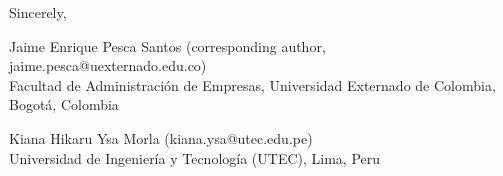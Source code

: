 \documentclass[11pt]{article}
\begin{document}
Sincerely,

\vspace{1.5em}

Jaime Enrique Pesca Santos (corresponding author,
jaime.pesca@uexternado.edu.co)\\
Facultad de Administraci\'on de Empresas, Universidad Externado de
Colombia, Bogot\'a, Colombia

\vspace{0.8em}

Kiana Hikaru Ysa Morla (kiana.ysa@utec.edu.pe)\\
Universidad de Ingenier\'ia y Tecnolog\'ia (UTEC), Lima, Peru
\end{document}
